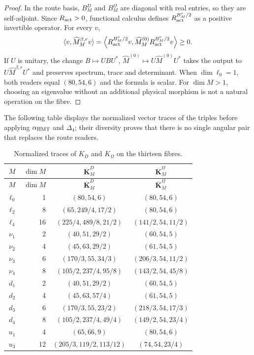 \begin{proof}
In the route basis, \(B_M^D\) and \(B_M^\Omega\) are diagonal with real entries, so they are self-adjoint. Since \(R_{\rm act}>0\), functional calculus defines \(R_{\rm act}^{B_M^r/2}\) as a positive invertible operator. For every \(v\),
\[
 \langle v,\widehat M_M^{\beta,r}v\rangle
 =\left\langle R_{\rm act}^{B_M^r/2}v,
 \widehat M_M^{(0)}R_{\rm act}^{B_M^r/2}v\right\rangle\ge0.
\]
If \(U\) is unitary, the change \(B\mapsto UBU^*\), \(\widehat M^{(0)}\mapsto
U\widehat M^{(0)}U^*\) takes the output to \(U\widehat M^{\beta,r}U^*\) and preserves spectrum, trace and determinant. When \(\dim\ell_0=1\), both readers equal \((80,54,6)\) and the formula is scalar. For \(\dim M>1\), choosing an eigenvalue without an additional physical morphism is not a natural operation on the fibre.
\end{proof}

The following table displays the normalized vector traces of the triples before applying \(\alpha_{\rm HMT}\) and \(\Delta_4\); their diversity proves that there is no single angular pair that replaces the route readers.
\begin{longtable}{@{}c r c c@{}}
\caption{Normalized traces of \(K_D\) and \(K_\Omega\) on the thirteen fibres.}
\label{10j-tab-trazas-13}\\
\toprule
\(M\)&\(\dim M\)&\(\overline{\mathbf K}_M^D\)&
\(\overline{\mathbf K}_M^\Omega\)\\
\midrule
\endfirsthead
\toprule
\(M\)&\(\dim M\)&\(\overline{\mathbf K}_M^D\)&
\(\overline{\mathbf K}_M^\Omega\)\\
\midrule
\endhead
\(\ell_0\)&1&\((80,54,6)\)&\((80,54,6)\)\\
\(\ell_2\)&8&\((65,249/4,17/2)\)&\((80,54,6)\)\\
\(\ell_4\)&16&\((225/4,489/8,21/2)\)&\((141/2,54,11/2)\)\\
\(\nu_1\)&2&\((40,51,29/2)\)&\((60,54,5)\)\\
\(\nu_2\)&4&\((45,63,29/2)\)&\((61,54,5)\)\\
\(\nu_3\)&6&\((170/3,55,34/3)\)&\((206/3,54,11/2)\)\\
\(\nu_4\)&8&\((105/2,237/4,95/8)\)&\((143/2,54,45/8)\)\\
\(d_1\)&2&\((40,51,29/2)\)&\((60,54,5)\)\\
\(d_2\)&4&\((45,63,57/4)\)&\((61,54,5)\)\\
\(d_3\)&6&\((170/3,55,23/2)\)&\((218/3,54,17/3)\)\\
\(d_4\)&8&\((105/2,237/4,49/4)\)&\((149/2,54,23/4)\)\\
\(u_1\)&4&\((65,66,9)\)&\((80,54,6)\)\\
\(u_3\)&12&\((205/3,119/2,113/12)\)&\((74,54,23/4)\)\\
\bottomrule
\end{longtable}

